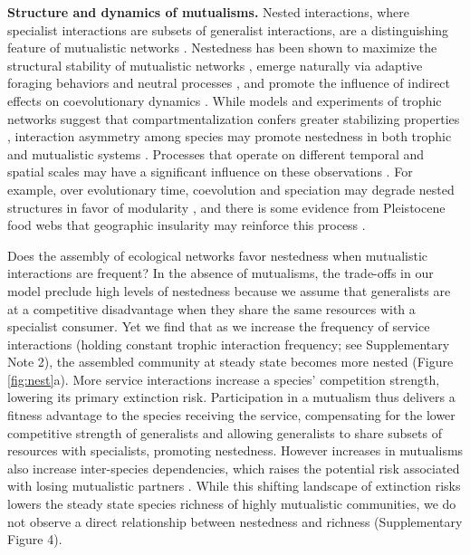 \documentclass[twocolumn,preprintnumbers,amsmath,amssymb,superscriptaddress,linenumbers]{revtex4-1}
\begin{document}
\vspace{0mm}
\noindent \textbf{Structure and dynamics of mutualisms.}
Nested interactions, where specialist interactions are subsets of generalist interactions, are a distinguishing feature of mutualistic networks \cite{Bascompte2003,Bascompte2006,Guimaraes2006,Araujo2010}.
Nestedness has been shown to maximize the structural stability of mutualistic networks \cite{Rohr2014}, emerge naturally via adaptive foraging behaviors \cite{Valdovinos2016,Valdovinos2019} and neutral processes \cite{Krishna2008}, and promote the influence of indirect effects on coevolutionary dynamics \cite{Guimaraes2017}.
While models and experiments of trophic networks suggest that compartmentalization confers greater stabilizing properties \cite{Stouffer2011,Gilarranz2017}, interaction asymmetry among species may promote nestedness in both trophic \cite{Araujo2010} and mutualistic systems \cite{Pires2011}.
Processes that operate on different temporal and spatial scales may have a significant influence on these observations \cite{Massol2011}.
For example, over evolutionary time, coevolution and speciation may degrade nested structures in favor of modularity \cite{Ponisio2019}, and there is some evidence from Pleistocene food webs that geographic insularity may reinforce this process \cite{Yeakel2013}.

Does the assembly of ecological networks favor nestedness when mutualistic interactions are frequent?
In the absence of mutualisms, the trade-offs in our model preclude high levels of nestedness because we assume that generalists are at a competitive disadvantage when they share the same resources with a specialist consumer.
Yet we find that as we increase the frequency of service interactions (holding constant trophic interaction frequency; see Supplementary Note 2), the assembled community at steady state becomes more nested (Figure \ref{fig:nest}a).
More service interactions increase a species' competition strength, lowering its primary extinction risk.
Participation in a mutualism thus delivers a fitness advantage to the species receiving the service, compensating for the lower competitive strength of generalists and allowing generalists to share subsets of resources with specialists, promoting nestedness.
However increases in mutualisms also increase inter-species dependencies, which raises the potential risk associated with losing mutualistic partners \cite{Bond1994,Colwell2012}. %
While this shifting landscape of extinction risks lowers the steady state species richness of highly mutualistic communities, we do not observe a direct relationship between nestedness and richness (Supplementary Figure 4). %
\end{document}

